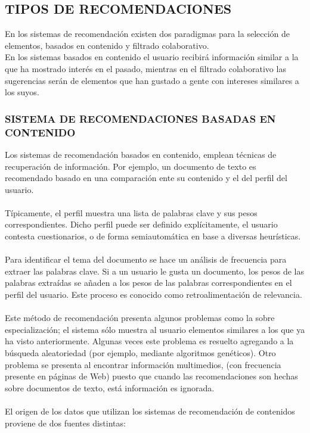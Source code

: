 \documentclass[11pt,a4paper]{article}
\begin{document}
		 \subsection{TIPOS DE RECOMENDACIONES}	
		 
		 En los sistemas de recomendación existen dos paradigmas para la selección de elementos, basados en contenido y filtrado colaborativo. %
		 \\
		 En los sistemas basados en contenido el usuario recibirá información similar a la que ha mostrado interés en el pasado, mientras en el filtrado colaborativo las sugerencias serán de elementos que han gustado a gente con intereses similares a los suyos.
		 
		 \subsubsection{SISTEMA DE RECOMENDACIONES BASADAS EN CONTENIDO}
		 
		 Los sistemas de recomendación basados en contenido, emplean técnicas de recuperación de información. Por ejemplo, un documento de texto es recomendado basado en una comparación ente su contenido y el del perfil del usuario.\\
		 \\
		 Típicamente, el perfil muestra una lista de palabras clave y sus pesos correspondientes. Dicho perfil puede ser definido explícitamente, el usuario contesta cuestionarios, o de forma semiautomática en base a diversas heurísticas.%
		 \\
		 \\
		 Para identificar el tema del documento se hace un análisis de frecuencia para extraer las palabras clave. Si a un usuario le gusta un documento, los pesos de las palabras extraídas se añaden a los pesos de las palabras correspondientes en el perfil del usuario. Este proceso es conocido como retroalimentación de relevancia. %
		 \\
		 \\
		 Este método de recomendación presenta algunos problemas como la sobre especialización; el sistema sólo muestra al usuario elementos similares a los que ya ha visto anteriormente. Algunas veces este problema es resuelto agregando a la búsqueda aleatoriedad (por ejemplo, mediante algoritmos genéticos). Otro problema se presenta al encontrar información multimedios, (con frecuencia presente en páginas de Web) puesto que cuando las recomendaciones son hechas sobre documentos de texto, está información es ignorada.\\
		 \\
		 El origen de los datos que utilizan los sistemas de recomendación de contenidos proviene de dos fuentes distintas: 
		 
\end{document}
